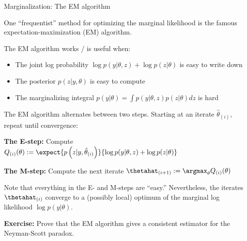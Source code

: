 \begin{frame}{Marginalization: The EM algorithm}

One ``frequentist'' method for optimizing the marginal likelihood is the
famous expectation-maximization (EM) algorithm.

The EM algorithm works / is useful when:

\begin{itemize}
    \item The joint log probability $\log p(y | \theta, z) + \log p(z | \theta)$ is easy to write down
    \item The posterior $p(z | y, \theta)$ is easy to compute
    \item The marginalizing integral $p(y | \theta) = \int p(y | \theta, z) p(z | \theta) dz$ is hard
\end{itemize}

\pause
\hrulefill

The EM algorithm alternates between two steps.  Starting at an iterate
$\hat\theta_{(i)}$, repeat until convergence:

\textbf{The E-step:}  Compute $Q_{(i)}(\theta) := \expect{p\left(z | y, \hat\theta_{(i)} \right)}{\log p(y | \theta, z) + \log p(z | \theta)}$

\textbf{The M-step:}  Compute the next iterate $\thetahat_{(i + 1)} := \argmax_\theta Q_{(i)}(\theta)$

\pause
\hrulefill

Note that everything in the E- and M-steps are ``easy.''  Nevertheless, the
iterates $\thetahat_{(i)}$ converge to a (possibly local) optimum of the
marginal log likelihood $\log p(y | \theta)$.

\vspace{1em}

\pause

\textbf{Exercise: }  Prove that the EM algorithm gives a consistent estimator
for the Neyman-Scott paradox.

\end{frame}
